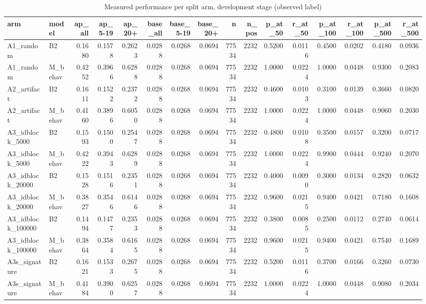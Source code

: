 \begin{table}
\caption{Measured performance per split arm, development stage (observed label)}
\label{tab:tab_split_audit}
\begin{tabular}{llrrrrrrrrrrrrrr}
\toprule
arm & model & ap\_all & ap\_5-19 & ap\_20+ & base\_all & base\_5-19 & base\_20+ & n & n\_pos & p\_at\_50 & r\_at\_50 & p\_at\_100 & r\_at\_100 & p\_at\_500 & r\_at\_500 \\
\midrule
A1\_random & B2 & 0.1680 & 0.1578 & 0.2623 & 0.0288 & 0.0268 & 0.0694 & 77534 & 2232 & 0.5200 & 0.0116 & 0.4500 & 0.0202 & 0.4180 & 0.0936 \\
A1\_random & M\_behav & 0.4252 & 0.3966 & 0.6288 & 0.0288 & 0.0268 & 0.0694 & 77534 & 2232 & 1.0000 & 0.0224 & 1.0000 & 0.0448 & 0.9300 & 0.2083 \\
A2\_artifact & B2 & 0.1611 & 0.1522 & 0.2372 & 0.0288 & 0.0268 & 0.0694 & 77534 & 2232 & 0.4600 & 0.0103 & 0.3100 & 0.0139 & 0.3660 & 0.0820 \\
A2\_artifact & M\_behav & 0.4160 & 0.3896 & 0.6050 & 0.0288 & 0.0268 & 0.0694 & 77534 & 2232 & 1.0000 & 0.0224 & 1.0000 & 0.0448 & 0.9060 & 0.2030 \\
A3\_idblock\_5000 & B2 & 0.1593 & 0.1500 & 0.2547 & 0.0288 & 0.0268 & 0.0694 & 77534 & 2232 & 0.4800 & 0.0108 & 0.3500 & 0.0157 & 0.3200 & 0.0717 \\
A3\_idblock\_5000 & M\_behav & 0.4222 & 0.3943 & 0.6289 & 0.0288 & 0.0268 & 0.0694 & 77534 & 2232 & 1.0000 & 0.0224 & 0.9900 & 0.0444 & 0.9240 & 0.2070 \\
A3\_idblock\_20000 & B2 & 0.1528 & 0.1516 & 0.2351 & 0.0288 & 0.0268 & 0.0694 & 77534 & 2232 & 0.4000 & 0.0090 & 0.3000 & 0.0134 & 0.2820 & 0.0632 \\
A3\_idblock\_20000 & M\_behav & 0.3827 & 0.3546 & 0.6146 & 0.0288 & 0.0268 & 0.0694 & 77534 & 2232 & 0.9600 & 0.0215 & 0.9400 & 0.0421 & 0.7180 & 0.1608 \\
A3\_idblock\_100000 & B2 & 0.1494 & 0.1477 & 0.2353 & 0.0288 & 0.0268 & 0.0694 & 77534 & 2232 & 0.3800 & 0.0085 & 0.2500 & 0.0112 & 0.2740 & 0.0614 \\
A3\_idblock\_100000 & M\_behav & 0.3864 & 0.3584 & 0.6165 & 0.0288 & 0.0268 & 0.0694 & 77534 & 2232 & 0.9600 & 0.0215 & 0.9400 & 0.0421 & 0.7540 & 0.1689 \\
A3s\_signature & B2 & 0.1621 & 0.1533 & 0.2675 & 0.0288 & 0.0268 & 0.0694 & 77534 & 2232 & 0.5200 & 0.0116 & 0.3700 & 0.0166 & 0.3260 & 0.0730 \\
A3s\_signature & M\_behav & 0.4184 & 0.3900 & 0.6257 & 0.0288 & 0.0268 & 0.0694 & 77534 & 2232 & 1.0000 & 0.0224 & 1.0000 & 0.0448 & 0.9080 & 0.2034 \\

\end{tabular}
\end{table}
